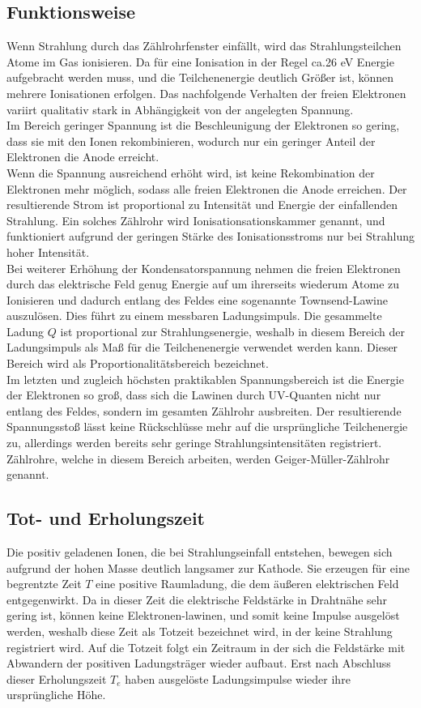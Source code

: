 \documentclass{scrartcl}
\begin{document}
\subsection{Funktionsweise}
Wenn Strahlung durch das Zählrohrfenster einfällt, wird das Strahlungsteilchen Atome im Gas ionisieren. Da für eine Ionisation in der Regel ca.26 eV Energie aufgebracht werden muss, und die Teilchenenergie deutlich Größer ist, können mehrere Ionisationen erfolgen. Das nachfolgende Verhalten der freien Elektronen variirt qualitativ stark in Abhängigkeit von der angelegten Spannung. \\
Im Bereich geringer Spannung ist die Beschleunigung der Elektronen so gering, dass sie mit den Ionen rekombinieren, wodurch nur ein geringer Anteil der Elektronen die Anode erreicht.\\ Wenn die Spannung ausreichend erhöht wird, ist keine Rekombination der Elektronen mehr möglich, sodass alle freien Elektronen die Anode erreichen. Der resultierende Strom ist proportional zu Intensität und Energie der einfallenden Strahlung. Ein solches Zählrohr wird Ionisationsationskammer genannt, und funktioniert aufgrund der geringen Stärke des Ionisationsstroms nur bei Strahlung hoher Intensität. \\
Bei weiterer Erhöhung der Kondensatorspannung nehmen die freien Elektronen durch das elektrische Feld genug Energie auf um ihrerseits wiederum Atome zu Ionisieren und dadurch entlang des Feldes eine sogenannte Townsend-Lawine auszulösen. Dies führt zu einem messbaren Ladungsimpuls. Die gesammelte Ladung $Q$ ist proportional zur Strahlungsenergie, weshalb in diesem Bereich der Ladungsimpuls als Maß für die Teilchenenergie verwendet werden kann. Dieser Bereich wird als Proportionalitätsbereich bezeichnet. \\ Im letzten und zugleich höchsten praktikablen Spannungsbereich ist die Energie der Elektronen so groß, dass sich die Lawinen durch UV-Quanten nicht nur entlang des Feldes, sondern im gesamten Zählrohr ausbreiten. Der resultierende Spannungsstoß lässt keine Rückschlüsse mehr auf die ursprüngliche Teilchenergie zu, allerdings werden bereits sehr geringe Strahlungsintensitäten registriert. Zählrohre, welche in diesem Bereich arbeiten, werden Geiger-Müller-Zählrohr genannt.
\subsection{Tot- und Erholungszeit}
Die positiv geladenen Ionen, die bei Strahlungseinfall entstehen, bewegen sich aufgrund der hohen Masse deutlich langsamer zur Kathode. Sie erzeugen für eine begrentzte Zeit $T$ eine positive Raumladung, die dem äußeren elektrischen Feld entgegenwirkt. Da in dieser Zeit die elektrische Feldstärke in Drahtnähe sehr gering ist, können keine Elektronen-lawinen, und somit keine Impulse ausgelöst werden, weshalb diese Zeit als Totzeit bezeichnet wird, in der keine Strahlung registriert wird. Auf die Totzeit folgt ein Zeitraum in der sich die Feldstärke mit Abwandern der positiven Ladungsträger wieder aufbaut. Erst nach Abschluss dieser Erholungszeit $T_e$ haben ausgelöste Ladungsimpulse wieder ihre ursprüngliche Höhe.
\end{document}
